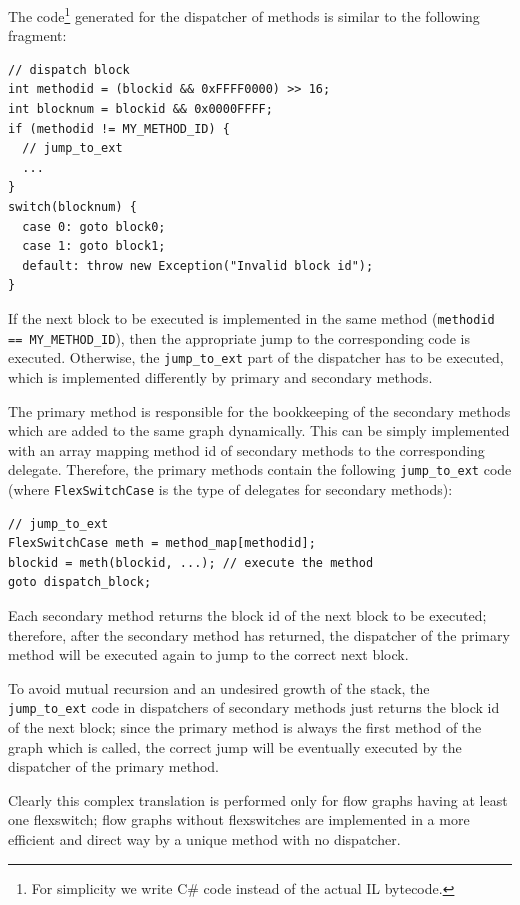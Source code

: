 The code\footnote{For simplicity we write C\# code instead of
the actual IL bytecode.} generated for the dispatcher of methods
is similar to the following fragment: 
\begin{small}
\begin{lstlisting}[language={[Sharp]C}]
// dispatch block
int methodid = (blockid && 0xFFFF0000) >> 16; 
int blocknum = blockid && 0x0000FFFF;         
if (methodid != MY_METHOD_ID) {
  // jump_to_ext 
  ...
}
switch(blocknum) {
  case 0: goto block0;
  case 1: goto block1;
  default: throw new Exception("Invalid block id");
}
\end{lstlisting}
\end{small}
If the next block to be executed is implemented in the same method
({\small\lstinline{methodid == MY_METHOD_ID}}), then the appropriate
jump to the corresponding code is executed.
Otherwise, the \lstinline{jump_to_ext}
part of the dispatcher has to be executed, which is implemented differently 
by primary and secondary methods.

The primary method is responsible for the bookkeeping of the secondary
methods which are added to the same graph dynamically. This can be 
simply implemented with an array mapping method id of secondary methods
to the corresponding delegate. Therefore, the primary methods contain
the following \lstinline{jump_to_ext} code (where
\lstinline{FlexSwitchCase} is the type of delegates for secondary methods):
\begin{small}
\begin{lstlisting}[language={[Sharp]C}] 
// jump_to_ext
FlexSwitchCase meth = method_map[methodid];
blockid = meth(blockid, ...); // execute the method
goto dispatch_block;
\end{lstlisting}
\end{small}
Each secondary method returns the block id of the next block to be
executed; therefore, after the secondary method has returned, the
dispatcher of the primary method will be executed again to jump
to the correct next block. 

To avoid mutual recursion and an undesired growth of the stack,
the \lstinline{jump_to_ext} code in dispatchers of secondary methods
just returns the block id of the next block; since the primary method
is always the first method of the graph which is called, the correct
jump will be eventually executed by the dispatcher of the primary method.

Clearly this complex translation is performed only for flow graphs
having at least one flexswitch; flow graphs without flexswitches
are implemented in a more efficient and direct way by a unique method
with no dispatcher.

